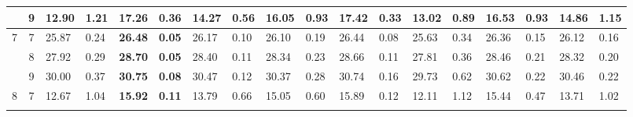 \documentclass[conference]{IEEEtran}
\begin{document}
\begin{table}[t]
\begin{tabular}{|cc|ll|ll|ll|ll|ll|ll|ll|ll|}
		\multicolumn{1}{|c|}{}                    & 9          & \multicolumn{1}{l|}{12.90}         & 1.21                              & \multicolumn{1}{l|}{17.26}          & 0.36                              & \multicolumn{1}{l|}{14.27}         & 0.56                              & \multicolumn{1}{l|}{16.05}         & 0.93                              & \multicolumn{1}{l|}{\textbf{17.42}}       & \textbf{0.33} & \multicolumn{1}{l|}{13.02} & 0.89 & \multicolumn{1}{l|}{16.53}          & 0.93          & \multicolumn{1}{l|}{14.86} & 1.15 \\ \hline
		\multicolumn{1}{|c|}{\multirow{3}{*}{7}}  & 7          & \multicolumn{1}{l|}{25.87}         & 0.24                              & \multicolumn{1}{l|}{\textbf{26.48}} & \textbf{0.05}                     & \multicolumn{1}{l|}{26.17}         & 0.10                              & \multicolumn{1}{l|}{26.10}         & 0.19                              & \multicolumn{1}{l|}{26.44}                & 0.08          & \multicolumn{1}{l|}{25.63} & 0.34 & \multicolumn{1}{l|}{26.36}          & 0.15          & \multicolumn{1}{l|}{26.12} & 0.16 \\ \cline{2-18} 
		\multicolumn{1}{|c|}{}                    & 8          & \multicolumn{1}{l|}{27.92}         & 0.29                              & \multicolumn{1}{l|}{\textbf{28.70}} & \textbf{0.05}                     & \multicolumn{1}{l|}{28.40}         & 0.11                              & \multicolumn{1}{l|}{28.34}         & 0.23                              & \multicolumn{1}{l|}{28.66}                & 0.11          & \multicolumn{1}{l|}{27.81} & 0.36 & \multicolumn{1}{l|}{28.46}          & 0.21          & \multicolumn{1}{l|}{28.32} & 0.20 \\ \cline{2-18} 
		\multicolumn{1}{|c|}{}                    & 9          & \multicolumn{1}{l|}{30.00}         & 0.37                              & \multicolumn{1}{l|}{\textbf{30.75}} & \textbf{0.08}                     & \multicolumn{1}{l|}{30.47}         & 0.12                              & \multicolumn{1}{l|}{30.37}         & 0.28                              & \multicolumn{1}{l|}{30.74}                & 0.16          & \multicolumn{1}{l|}{29.73} & 0.62 & \multicolumn{1}{l|}{30.62}          & 0.22          & \multicolumn{1}{l|}{30.46} & 0.22 \\ \hline
		\multicolumn{1}{|c|}{\multirow{3}{*}{8}}  & 7          & \multicolumn{1}{l|}{12.67}         & 1.04                              & \multicolumn{1}{l|}{\textbf{15.92}} & \textbf{0.11}                     & \multicolumn{1}{l|}{13.79}         & 0.66                              & \multicolumn{1}{l|}{15.05}         & 0.60                              & \multicolumn{1}{l|}{15.89}                & 0.12          & \multicolumn{1}{l|}{12.11} & 1.12 & \multicolumn{1}{l|}{15.44}          & 0.47          & \multicolumn{1}{l|}{13.71} & 1.02 \\ \cline{2-18} 

\end{tabular}
\end{table}
\end{document}
